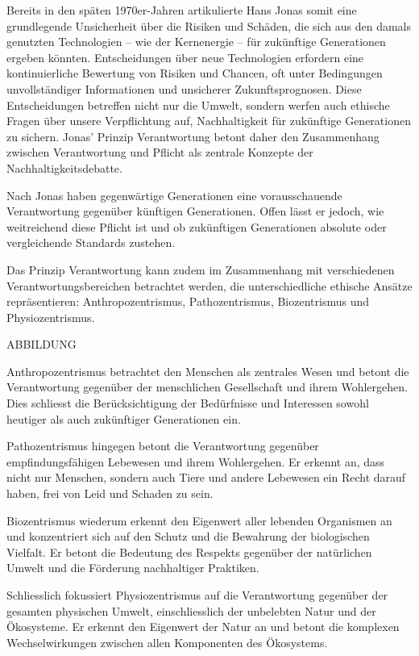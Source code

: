 \documentclass[
  letterpaper,
  DIV=11,
  numbers=noendperiod]{scrartcl}
\begin{document}
Bereits in den späten 1970er-Jahren artikulierte Hans Jonas somit eine
grundlegende Unsicherheit über die Risiken und Schäden, die sich aus den
damals genutzten Technologien -- wie der Kernenergie -- für zukünftige
Generationen ergeben könnten. Entscheidungen über neue Technologien
erfordern eine kontinuierliche Bewertung von Risiken und Chancen, oft
unter Bedingungen unvollständiger Informationen und unsicherer
Zukunftsprognosen. Diese Entscheidungen betreffen nicht nur die Umwelt,
sondern werfen auch ethische Fragen über unsere Verpflichtung auf,
Nachhaltigkeit für zukünftige Generationen zu sichern. Jonas' Prinzip
Verantwortung betont daher den Zusammenhang zwischen Verantwortung und
Pflicht als zentrale Konzepte der Nachhaltigkeitsdebatte.

Nach Jonas haben gegenwärtige Generationen eine vorausschauende
Verantwortung gegenüber künftigen Generationen. Offen lässt er jedoch,
wie weitreichend diese Pflicht ist und ob zukünftigen Generationen
absolute oder vergleichende Standards zustehen.

Das Prinzip Verantwortung kann zudem im Zusammenhang mit verschiedenen
Verantwortungsbereichen betrachtet werden, die unterschiedliche ethische
Ansätze repräsentieren: Anthropozentrismus, Pathozentrismus,
Biozentrismus und Physiozentrismus.

ABBILDUNG

Anthropozentrismus betrachtet den Menschen als zentrales Wesen und
betont die Verantwortung gegenüber der menschlichen Gesellschaft und
ihrem Wohlergehen. Dies schliesst die Berücksichtigung der Bedürfnisse
und Interessen sowohl heutiger als auch zukünftiger Generationen ein.

Pathozentrismus hingegen betont die Verantwortung gegenüber
empfindungsfähigen Lebewesen und ihrem Wohlergehen. Er erkennt an, dass
nicht nur Menschen, sondern auch Tiere und andere Lebewesen ein Recht
darauf haben, frei von Leid und Schaden zu sein.

Biozentrismus wiederum erkennt den Eigenwert aller lebenden Organismen
an und konzentriert sich auf den Schutz und die Bewahrung der
biologischen Vielfalt. Er betont die Bedeutung des Respekts gegenüber
der natürlichen Umwelt und die Förderung nachhaltiger Praktiken.

Schliesslich fokussiert Physiozentrismus auf die Verantwortung gegenüber
der gesamten physischen Umwelt, einschliesslich der unbelebten Natur und
der Ökosysteme. Er erkennt den Eigenwert der Natur an und betont die
komplexen Wechselwirkungen zwischen allen Komponenten des Ökosystems.
\end{document}
